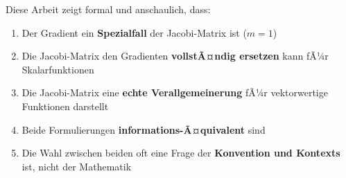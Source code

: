 ﻿\documentclass[a4paper,12pt]{article}
\theoremstyle{definition}
\begin{document}
Diese Arbeit zeigt formal und anschaulich, dass:

\begin{enumerate}
	\item Der Gradient ein \textbf{Spezialfall} der Jacobi-Matrix ist ($m=1$)
	\item Die Jacobi-Matrix den Gradienten \textbf{vollstÃ¤ndig ersetzen} kann fÃ¼r Skalarfunktionen
	\item Die Jacobi-Matrix eine \textbf{echte Verallgemeinerung} fÃ¼r vektorwertige Funktionen darstellt
	\item Beide Formulierungen \textbf{informations-Ã¤quivalent} sind
	\item Die Wahl zwischen beiden oft eine Frage der \textbf{Konvention und Kontexts} ist, nicht der Mathematik
\end{enumerate}

\newpage
\end{document}
